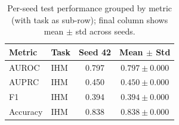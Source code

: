 \begin{table}[h]
\centering
\small
\begin{tabular}{ll|c|c}
\hline
Metric & Task & Seed 42 & Mean $\pm$ Std \\
\hline
AUROC & IHM & 0.797 & $0.797 \pm 0.000$ \\
\hline
AUPRC & IHM & 0.450 & $0.450 \pm 0.000$ \\
\hline
F1 & IHM & 0.394 & $0.394 \pm 0.000$ \\
\hline
Accuracy & IHM & 0.838 & $0.838 \pm 0.000$ \\
\hline
\end{tabular}
\caption{Per-seed test performance grouped by metric (with task as sub-row); final column shows mean $\pm$ std across seeds.}
\end{table}
